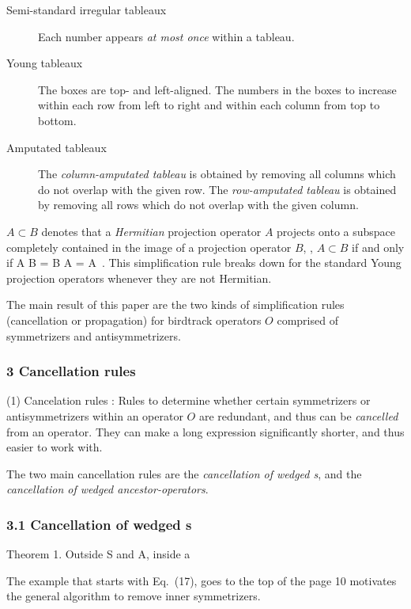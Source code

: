 \begin{description}
  \item[Semi-standard irregular tableaux]
Each number
appears \emph{at most once} within a tableau.
  \item[Young tableaux]
The boxes are top- and left-aligned.
The numbers in the boxes to increase within each row from left to right and
within each column from top to bottom.
  \item[Amputated tableaux]
The \emph{column-amputated tableau} is obtained by removing all columns
which do not overlap with the given row.
The \emph{row-amputated tableau}  is obtained by removing all rows which do
not overlap with the given column.
\end{description}

$A\subset B $ denotes that a \emph{Hermitian} projection operator $A$
projects onto a subspace completely contained in the image of a projection
operator $B$, \ie, $A\subset B$ if and only if
\beq
  \label{eq:OperatorInclusion1}
  A \cdot B = B \cdot A = A
\,.
\eeq
This simplification rule breaks down for the standard Young projection
operators whenever they are not Hermitian.

The main result of this paper are the two kinds of simplification rules
(cancellation or propagation) for birdtrack operators $O$ comprised of
symmetrizers and antisymmetrizers.

\subsubsection{%
3 Cancellation rules}

(1) Cancelation rules : Rules to determine whether certain symmetrizers or
antisymmetrizers within an operator $O$ are redundant, and thus can be
\emph{cancelled} from an operator. They can make a long expression
significantly shorter, and thus easier to work with.

The two main cancellation rules are
the {\em cancellation of wedged \Ypo s}, and
the {\em cancellation of wedged ancestor-operators}.

\subsubsection{%
3.1 Cancellation of wedged \Ypo s}

Theorem 1. Outside S and A, inside a \Ypo\

The example that starts with Eq.~(17), goes to the top of the page 10
motivates the general algorithm to remove inner symmetrizers.

